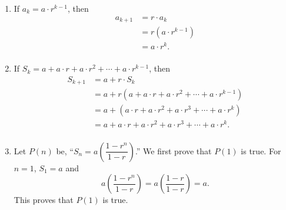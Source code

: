 \begin{enumerate}
\item If $a_k = a \cdot r^{k - 1}$, then
\begin{align*}
a_{k+1} &= r \cdot a_k \\
        &= r \left( a \cdot r^{k-1} \right) \\
        &= a \cdot r^k. \\
\end{align*}



\item If $S_k  = a + a \cdot r + a \cdot r^2  +  \cdots  + a \cdot r^{k - 1}$, then
\begin{align*}
S_{k + 1}  &= a + r \cdot S_k \\
           &= a + r \left( a + a \cdot r + a \cdot r^2  +  \cdots  + a \cdot r^{k - 1} \right) \\
           &= a + \left( a \cdot r + a \cdot r^2 + a \cdot r^3  +  \cdots  + a \cdot r^k \right) \\
           &= a + a \cdot r + a \cdot r^2 + a \cdot r^3  +  \cdots  + a \cdot r^k. \\
\end{align*}


\item Let  $P( n )$  be, ``$S_n  = a\left( {\dfrac{{1 - r^n }}{{1 - r}}} \right)$.''
We first prove that $P \left( 1 \right)$ is true.  For  $n = 1$,  $S_1  = a$  and  
\[
a\left( {\frac{{1 - r^n }}{{1 - r}}} \right) = a\left( {\frac{{1 - r}}{{1 - r}}} \right) = a.
\]
This proves that  $P\left( 1 \right)$ is true.


\end{enumerate}
